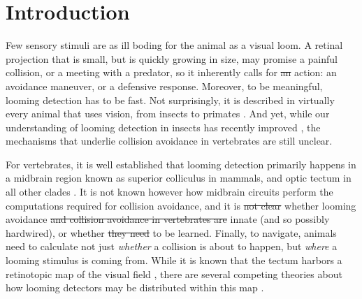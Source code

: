 \documentclass{article}
\providecommand{\DIFaddtex}[1]{{\protect\color{blue}{#1}}} %
\providecommand{\DIFdeltex}[1]{{\protect\color{red}\sout{#1}}}                      %
\providecommand{\DIFaddbegin}{} %
\providecommand{\DIFaddend}{} %
\providecommand{\DIFdelbegin}{} %
\providecommand{\DIFdelend}{} %
\providecommand{\DIFadd}[1]{\texorpdfstring{\DIFaddtex{#1}}{#1}} %
\providecommand{\DIFdel}[1]{\texorpdfstring{\DIFdeltex{#1}}{}} %
\newcommand{\DIFscaledelfig}{0.5}
\newlength{\DIFdelgraphicswidth} %
\newlength{\DIFdelgraphicsheight} %
\newcommand{\DIFaddincludegraphics}[2][]{{\color{blue}\fbox{\DIFOincludegraphics[#1]{#2}}}} %
\newcommand{\DIFdelincludegraphics}[2][]{%
\sbox{\DIFdelgraphicsbox}{\DIFOincludegraphics[#1]{#2}}%
\settoboxwidth{\DIFdelgraphicswidth}{\DIFdelgraphicsbox} %
\settoboxtotalheight{\DIFdelgraphicsheight}{\DIFdelgraphicsbox} %
\scalebox{\DIFscaledelfig}{%
\parbox[b]{\DIFdelgraphicswidth}{\usebox{\DIFdelgraphicsbox}\\[-\baselineskip] \rule{\DIFdelgraphicswidth}{0em}}\llap{\resizebox{\DIFdelgraphicswidth}{\DIFdelgraphicsheight}{%
\setlength{\unitlength}{\DIFdelgraphicswidth}%
\begin{picture}(1,1)%
\thicklines\linethickness{2pt} %
{\color[rgb]{1,0,0}\put(0,0){\framebox(1,1){}}}%
{\color[rgb]{1,0,0}\put(0,0){\line( 1,1){1}}}%
{\color[rgb]{1,0,0}\put(0,1){\line(1,-1){1}}}%
\end{picture}%
}\hspace*{3pt}}} %
} %
\DeclareRobustCommand{\DIFaddbegin}{\DIFOaddbegin \let\includegraphics\DIFaddincludegraphics} %
\DeclareRobustCommand{\DIFaddend}{\DIFOaddend \let\includegraphics\DIFOincludegraphics} %
\DeclareRobustCommand{\DIFdelbegin}{\DIFOdelbegin \let\includegraphics\DIFdelincludegraphics} %
\DeclareRobustCommand{\DIFdelend}{\DIFOaddend \let\includegraphics\DIFOincludegraphics} %
\begin{document}
\section*{Introduction}


Few sensory stimuli are as ill boding for the animal as a visual loom. A retinal projection that is small, but is quickly growing in size, may promise a painful collision, or a meeting with a predator, so it inherently calls for \DIFdelbegin \DIFdel{an }\DIFdelend action: an avoidance maneuver, or a defensive response. Moreover, to be meaningful, looming detection has to be fast. Not surprisingly, it is described in virtually every animal that uses vision, from insects to primates \citep{Pereira2016}. And yet, while our understanding of looming detection in insects has recently improved \citep{rind2016locust,von2017fruitfly}, the mechanisms that underlie collision avoidance in vertebrates are still unclear.

For vertebrates, it is well established that looming detection primarily happens in a midbrain region known as superior colliculus in mammals, and optic tectum in all other clades \citep{frost2004review, liu2011cat, khakhalin2014, dunn2016escapesZF}. It is not known however how midbrain circuits perform the computations required for collision avoidance, and it is \DIFdelbegin \DIFdel{not clear }\DIFdelend \DIFaddbegin \DIFadd{still unclear }\DIFaddend whether looming avoidance \DIFdelbegin \DIFdel{and collision avoidance in vertebrates are }\DIFdelend \DIFaddbegin \DIFadd{in vertebrates is }\DIFaddend innate (and so possibly hardwired), or whether \DIFdelbegin \DIFdel{they need }\DIFdelend \DIFaddbegin \DIFadd{it needs }\DIFaddend to be learned. Finally, to navigate, animals need to calculate not just \textit{whether} a collision is about to happen, but \textit{where} a looming stimulus is coming from. While it is known that the tectum harbors a retinotopic map of the visual field \citep{mclaughlin2003retinotopic, ruthazer2004map}, there are several competing theories about how looming detectors may be distributed within this map \citep{frost2004review}.
\end{document}
